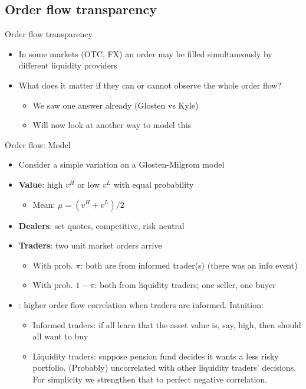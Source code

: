 \documentclass[english,10pt
,aspectratio=169
]{beamer}
\begin{document}
\subsection{Order flow transparency}

\begin{frame}{Order flow transparency}
	\begin{itemize}
		\item In some markets (OTC, FX) an order may be filled simultaneously by different liquidity providers
		\item What does it matter if they can or cannot observe the whole order flow?
		\pause
		\begin{itemize}
			\item We saw one answer already (Glosten vs Kyle)
			\item Will now look at another way to model this
		\end{itemize}
	\end{itemize}
\end{frame}


\begin{frame}{Order flow: Model}
	\begin{itemize}
		\item Consider a simple variation on a Glosten-Milgrom model
		\item \textbf{Value}: high $v^H$ or low $v^L$ with equal probability
		\begin{itemize}
			\item Mean: $\mu=(v^H+v^L)/2$
		\end{itemize}
		\item \textbf{Dealers}: set quotes, competitive, risk neutral
		\item \textbf{Traders}: two unit market orders arrive
		\begin{itemize}
			\item With prob. $\pi$: both are from informed trader(s) (there was an info event)
			\item With prob. $1-\pi$: both from liquidity traders;  one seller, one buyer
		\end{itemize}
		\item {}: higher order flow correlation  when traders are informed. Intuition: 
		\begin{itemize}
			\item Informed traders: if all learn that the asset value is, say, high, then should all want to buy
			\item Liquidity traders: suppose pension fund decides it wants a less risky portfolio. (Probably) uncorrelated with other liquidity traders' decisions. For simplicity we strengthen that to perfect negative correlation.
		\end{itemize}
	\end{itemize}
\end{frame}
\end{document}
